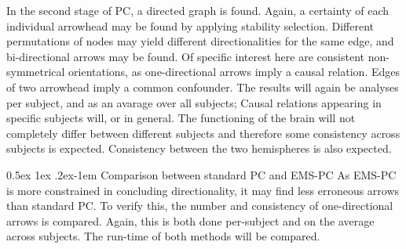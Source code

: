 \documentclass[a4paper, 10pt, english, onecolumn]{article}
\makeatletter
\renewcommand{\paragraph}{%
  \@startsection{paragraph}{4}%
  {\z@}{0.5ex \@plus 1ex \@minus .2ex}{-1em}%
  {\normalfont\normalsize\bfseries}%
}
\makeatother
\begin{document}
In the second stage of PC, a directed graph is found.
Again, a certainty of each individual arrowhead may be found by applying stability selection.
Different permutations of nodes may yield different directionalities for the same edge, and bi-directional arrows may be found.
Of specific interest here are consistent non-symmetrical orientations, as one-directional arrows imply a causal relation.
Edges of two arrowhead imply a common confounder.
The results will again be analyses per subject, and as an avarage over all subjects; Causal relations appearing in specific subjects will, or in general.
The functioning of the brain will not completely differ between different subjects and therefore some consistency across subjects is expected.
Consistency between the two hemispheres is also expected.


\paragraph{Comparison between standard PC and EMS-PC}
As EMS-PC is more constrained in concluding directionality, it may find less erroneous arrows than standard PC.
To verify this, the number and consistency of one-directional arrows is compared.
Again, this is both done per-subject and on the average across subjects.
The run-time of both methods will be compared.
\end{document}
